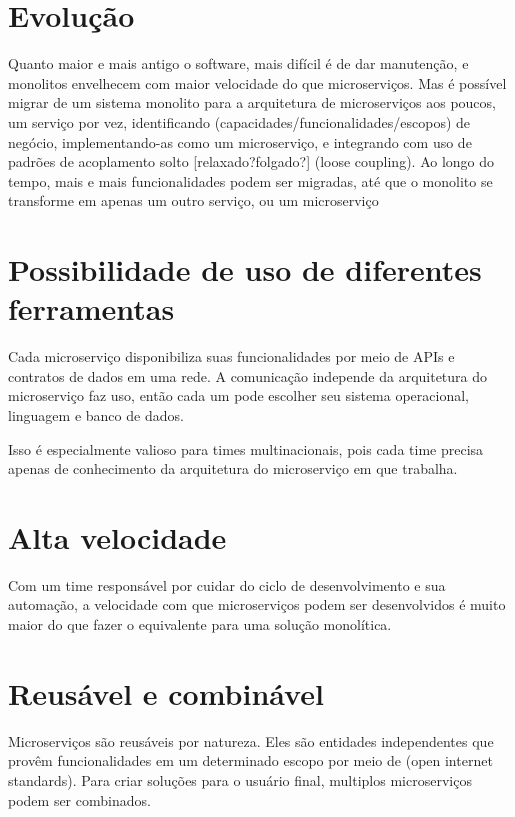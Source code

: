 \section*{Evolução}

Quanto maior e mais antigo o software, mais difícil é de dar manutenção, e monolitos envelhecem com maior velocidade do que microserviços. Mas é possível migrar de um sistema monolito para a arquitetura de microserviços aos poucos, um serviço por vez, identificando (capacidades/funcionalidades/escopos) de negócio, implementando-as como um microserviço, e integrando com uso de padrões de acoplamento solto [relaxado?folgado?] (loose coupling). Ao longo do tempo, mais e mais funcionalidades podem ser migradas, até que o monolito se transforme em apenas um outro serviço, ou um microserviço

\section*{Possibilidade de uso de diferentes ferramentas}

Cada microserviço disponibiliza suas funcionalidades por meio de APIs e contratos de dados em uma rede. A comunicação independe da arquitetura do microserviço faz uso, então cada um pode escolher seu sistema operacional, linguagem e banco de dados.

Isso é especialmente valioso para times multinacionais, pois cada time precisa apenas de conhecimento da arquitetura do microserviço em que trabalha.

\section*{Alta velocidade}

Com um time responsável por cuidar do ciclo de desenvolvimento e sua automação, a velocidade com que microserviços podem ser desenvolvidos é muito maior do que fazer o equivalente para uma solução monolítica.

\section*{Reusável e combinável}

Microserviços são reusáveis por natureza. Eles são entidades independentes que provêm funcionalidades em um determinado escopo por meio de (open internet standards). Para criar soluções para o usuário final, multiplos microserviços podem ser combinados.

